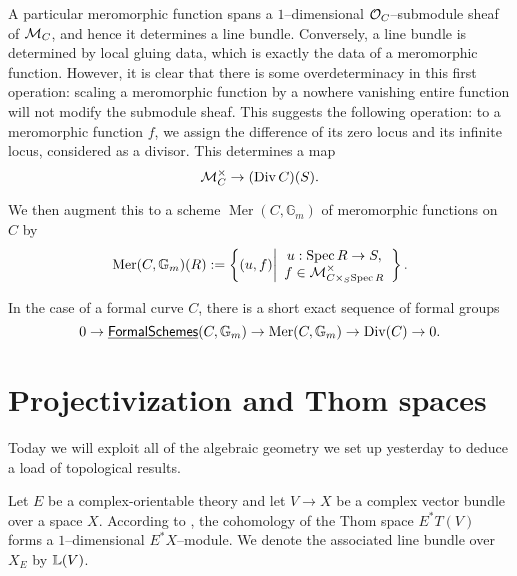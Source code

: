 A particular meromorphic function spans a $1$--dimensional $\mathcal{O}_C$--submodule sheaf of $\mathcal{M}_C$, and hence it determines a line bundle.  Conversely, a line bundle is determined by local gluing data, which is exactly the data of a meromorphic function.  However, it is clear that there is some overdeterminacy in this first operation: scaling a meromorphic function by a nowhere vanishing entire function will not modify the submodule sheaf.  This suggests the following operation: to a meromorphic function $f$, we assign the difference of its zero locus and its infinite locus, considered as a divisor.  This determines a map \[\mathcal{M}_C^\times \to (\operatorname{Div} C)(S).\]

\begin{definition}
We then augment this to a scheme $\operatorname{Mer}(C, \mathbb G_m)$ of meromorphic functions on $C$ by \[\operatorname{Mer}(C, \mathbb G_m)(R) := \left\{ (u, f) \middle| \begin{array}{c} u: \operatorname{Spec} R \to S, \\ f \in \mathcal{M}^\times_{C \times_S \operatorname{Spec} R} \end{array} \right\}.\]
\end{definition}

\begin{theorem}
In the case of a formal curve $C$, there is a short exact sequence of formal groups \[0 \to \InternalHom{FormalSchemes}(C, \mathbb G_m) \to \operatorname{Mer}(C, \mathbb G_m) \to \Div(C) \to 0. \qed\]
\end{theorem}







\section{Projectivization and Thom spaces}

Today we will exploit all of the algebraic geometry we set up yesterday to deduce a load of topological results.  

\begin{definition}
Let $E$ be a complex-orientable theory and let $V \to X$ be a complex vector bundle over a space $X$.  According to , the cohomology of the Thom space $E^* T(V)$ forms a $1$--dimensional $E^* X$--module.  We denote the associated line bundle over $X_E$ by $\mathbb{L}(V)$.
\end{definition}

